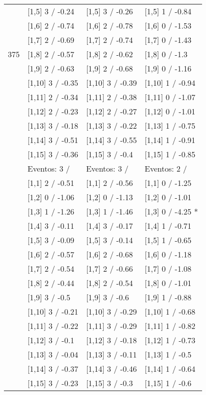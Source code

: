 \begin{table}
\begin{tabular}[t]{llll}
 & {}[1,5] 3  / -0.24 & {}[1,5] 3  / -0.26 & {}[1,5] 1  / -0.84\\
 & {}[1,6] 2  / -0.74 & {}[1,6] 2  / -0.78 & {}[1,6] 0  / -1.53\\
 & {}[1,7] 2  / -0.69 & {}[1,7] 2  / -0.74 & {}[1,7] 0  / -1.43\\
375 & {}[1,8] 2  / -0.57 & {}[1,8] 2  / -0.62 & {}[1,8] 0  / -1.3\\
\addlinespace
 & {}[1,9] 2  / -0.63 & {}[1,9] 2  / -0.68 & {}[1,9] 0  / -1.16\\
 & {}[1,10] 3  / -0.35 & {}[1,10] 3  / -0.39 & {}[1,10] 1  / -0.94\\
 & {}[1,11] 2  / -0.34 & {}[1,11] 2  / -0.38 & {}[1,11] 0  / -1.07\\
 & {}[1,12] 2  / -0.23 & {}[1,12] 2  / -0.27 & {}[1,12] 0  / -1.01\\
 & {}[1,13] 3  / -0.18 & {}[1,13] 3  / -0.22 & {}[1,13] 1  / -0.75\\
\addlinespace
 & {}[1,14] 3  / -0.51 & {}[1,14] 3  / -0.55 & {}[1,14] 1  / -0.91\\
 & {}[1,15] 3  / -0.36 & {}[1,15] 3  / -0.4 & {}[1,15] 1  / -0.85\\
 & Eventos:  3 / & Eventos:  3 / & Eventos:  2 /\\
 & {}[1,1] 2  / -0.51 & {}[1,1] 2  / -0.56 & {}[1,1] 0  / -1.25\\
 & {}[1,2] 0  / -1.06 & {}[1,2] 0  / -1.13 & {}[1,2] 0  / -1.01\\
\addlinespace
 & {}[1,3] 1  / -1.26 & {}[1,3] 1  / -1.46 & {}[1,3] 0  / -4.25 *\\
 & {}[1,4] 3  / -0.11 & {}[1,4] 3  / -0.17 & {}[1,4] 1  / -0.71\\
 & {}[1,5] 3  / -0.09 & {}[1,5] 3  / -0.14 & {}[1,5] 1  / -0.65\\
 & {}[1,6] 2  / -0.57 & {}[1,6] 2  / -0.68 & {}[1,6] 0  / -1.18\\
 & {}[1,7] 2  / -0.54 & {}[1,7] 2  / -0.66 & {}[1,7] 0  / -1.08\\
\addlinespace
500 & {}[1,8] 2  / -0.44 & {}[1,8] 2  / -0.54 & {}[1,8] 0  / -1.01\\
 & {}[1,9] 3  / -0.5 & {}[1,9] 3  / -0.6 & {}[1,9] 1  / -0.88\\
 & {}[1,10] 3  / -0.21 & {}[1,10] 3  / -0.29 & {}[1,10] 1  / -0.68\\
 & {}[1,11] 3  / -0.22 & {}[1,11] 3  / -0.29 & {}[1,11] 1  / -0.82\\
 & {}[1,12] 3  / -0.1 & {}[1,12] 3  / -0.18 & {}[1,12] 1  / -0.73\\
\addlinespace
 & {}[1,13] 3  / -0.04 & {}[1,13] 3  / -0.11 & {}[1,13] 1  / -0.5\\
 & {}[1,14] 3  / -0.37 & {}[1,14] 3  / -0.46 & {}[1,14] 1  / -0.64\\
 & {}[1,15] 3  / -0.23 & {}[1,15] 3  / -0.3 & {}[1,15] 1  / -0.6\\
\bottomrule
\end{tabular}
\end{table}
